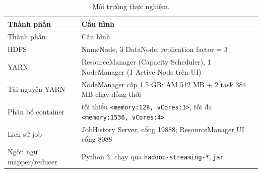 \documentclass[
  12pt,
  a4paper,
]{report}
\begin{document}
\begin{longtable}[]{@{}
  >{\raggedright\arraybackslash}p{}
  >{\raggedright\arraybackslash}p{}@{}}
\caption{\label{tbl:l02-env}Môi trường thực nghiệm.}\tabularnewline
\toprule\noalign{}
\begin{minipage}[b]{\linewidth}\raggedright
Thành phần
\end{minipage} & \begin{minipage}[b]{\linewidth}\raggedright
Cấu hình
\end{minipage} \\
\midrule\noalign{}
\endfirsthead
\toprule\noalign{}
\begin{minipage}[b]{\linewidth}\raggedright
Thành phần
\end{minipage} & \begin{minipage}[b]{\linewidth}\raggedright
Cấu hình
\end{minipage} \\
\midrule\noalign{}
\endhead
\bottomrule\noalign{}
\endlastfoot
HDFS & 1 NameNode, 3 DataNode, replication factor = 3 \\
YARN & 1 ResourceManager (Capacity Scheduler), 1 NodeManager (1 Active
Node trên UI) \\
Tài nguyên YARN & NodeManager cấp 1.5 GB: AM 512 MB + 2 task 384 MB chạy
đồng thời \\
Phân bổ container & tối thiểu
\texttt{\textless{}memory:}\allowbreak{}\texttt{128,}\allowbreak{}\texttt{\ vCores:}\allowbreak{}\texttt{1\textgreater{}}\allowbreak{},
tối đa
\texttt{\textless{}memory:}\allowbreak{}\texttt{1536,}\allowbreak{}\texttt{\ vCores:}\allowbreak{}\texttt{4\textgreater{}}\allowbreak{} \\
Lịch sử job & JobHistory Server, cổng 19888; ResourceManager UI cổng
8088 \\
Ngôn ngữ mapper/reducer & Python 3, chạy qua
\texttt{hadoop-streaming-*.}\allowbreak{}\texttt{jar}\allowbreak{} \\
\end{longtable}
\end{document}
